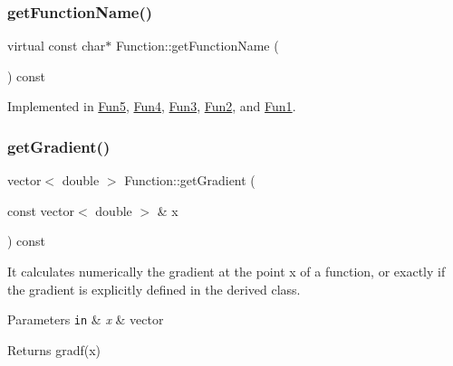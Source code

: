 \subsubsection{\texorpdfstring{get\+Function\+Name()}{getFunctionName()}}
{\footnotesize\ttfamily virtual const char$\ast$ Function\+::get\+Function\+Name (\begin{DoxyParamCaption}{ }\end{DoxyParamCaption}) const\hspace{0.3cm}{\ttfamily [pure virtual]}}



Implemented in \hyperlink{class_fun5_acaa887c03e39c037f49205b3b20b7464}{Fun5}, \hyperlink{class_fun4_a7d4a9da6240876674244784c79184772}{Fun4}, \hyperlink{class_fun3_a512d64bca04226bb354d8a7505794277}{Fun3}, \hyperlink{class_fun2_ac5702f1a8350b7a7f4b796b99cd5b08f}{Fun2}, and \hyperlink{class_fun1_a94ea2bb4448ebe03753de16d07784ea8}{Fun1}.

\mbox{\label{class_function_a9f2d70a7cf5875661a0f3b0e115dedc2}} 
\subsubsection{\texorpdfstring{get\+Gradient()}{getGradient()}}
{\footnotesize\ttfamily vector$<$ double $>$ Function\+::get\+Gradient (\begin{DoxyParamCaption}\item[{const vector$<$ double $>$ \&}]{x }\end{DoxyParamCaption}) const\hspace{0.3cm}{\ttfamily [virtual]}}



It calculates numerically the gradient at the point x of a function, or exactly if the gradient is explicitly defined in the derived class. 


\begin{DoxyParams}[1]{Parameters}
\mbox{\tt in}  & {\em x} & vector \\
\hline
\end{DoxyParams}
\begin{DoxyReturn}{Returns}
gradf(x) 
\end{DoxyReturn}
\mbox{\label{class_function_ae890d237648f6320730436a66920a6e7}} 
